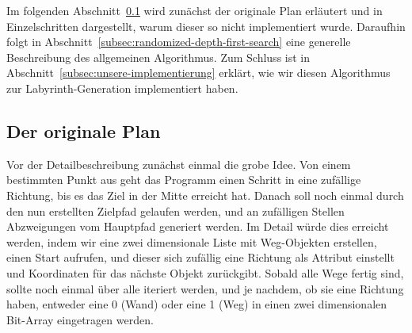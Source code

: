 Im folgenden Abschnitt~\ref{subsec:der-originale-plan} wird zunächst der originale Plan erläutert und in Einzelschritten dargestellt, warum dieser so nicht implementiert wurde.
Daraufhin folgt in Abschnitt~\ref{subsec:randomized-depth-first-search} eine generelle Beschreibung des allgemeinen  Algorithmus.
Zum Schluss ist in Abschnitt~\ref{subsec:unsere-implementierung} erklärt, wie wir diesen Algorithmus zur Labyrinth-Generation implementiert haben.
\subsection{Der originale Plan}\label{subsec:der-originale-plan}
Vor der Detailbeschreibung zunächst einmal die grobe Idee.
Von einem bestimmten Punkt aus geht das Programm einen Schritt in eine zufällige Richtung, bis es das Ziel in der Mitte erreicht hat.
Danach soll noch einmal durch den nun erstellten Zielpfad gelaufen werden, und an zufälligen Stellen Abzweigungen vom Hauptpfad generiert werden.
Im Detail würde dies erreicht werden, indem wir eine zwei dimensionale Liste mit Weg-Objekten erstellen, einen Start aufrufen, und dieser sich zufällig eine Richtung als Attribut einstellt und Koordinaten für das nächste Objekt zurückgibt.
Sobald alle Wege fertig sind, sollte noch einmal über alle iteriert werden, und je nachdem, ob sie eine Richtung haben, entweder eine 0 (Wand) oder eine 1 (Weg) in einen zwei dimensionalen Bit-Array eingetragen werden.

